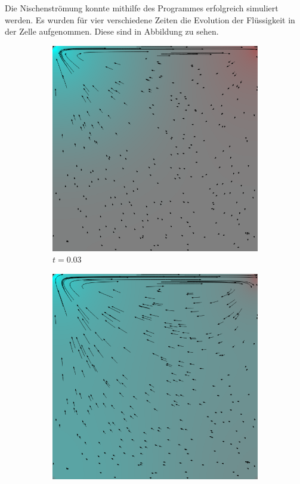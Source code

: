 		Die Nischenströmung konnte mithilfe des Programmes erfolgreich simuliert werden.
		Es wurden für vier verschiedene Zeiten die Evolution der Flüssigkeit in der Zelle aufgenommen.
		Diese sind in Abbildung zu sehen.

		\begin{figure}[!htb]
			\begin{subfigure}[b]{.5\textwidth}
				\center
				\includegraphics[scale=0.28]{screenshots/time-0030.png}
				\caption{$t=0.03$}
				\label{fig:time 01}
			\end{subfigure}
			\begin{subfigure}[b]{.5\textwidth}
				\center
				\includegraphics[scale = 0.28]{screenshots/time-0060.png}

\end{subfigure}
\end{figure}
